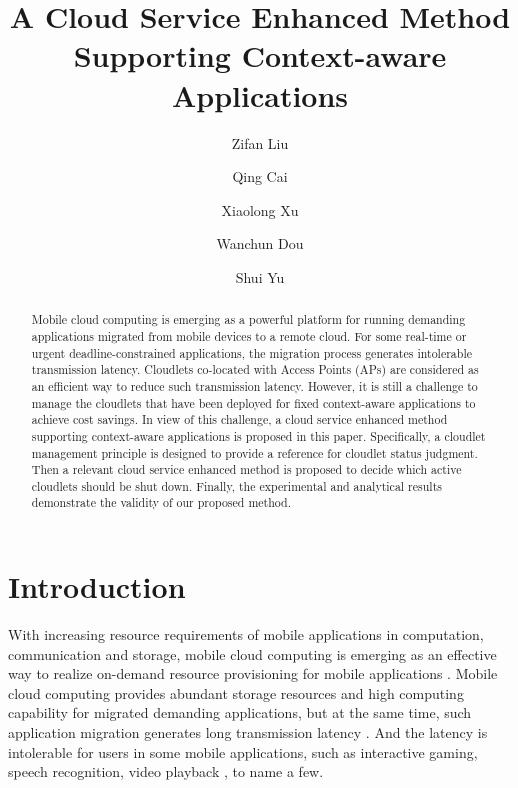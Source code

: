 \documentclass{llncs}
\begin{document}
%
\mainmatter
%
\title{A Cloud Service Enhanced Method Supporting Context-aware Applications}
%
\author{Zifan Liu \and Qing Cai \and Xiaolong Xu \and Wanchun Dou
\and Shui Yu
%
}
\maketitle

\begin{abstract}
Mobile cloud computing is emerging as a powerful platform for running demanding applications migrated from mobile devices to a remote cloud. For some real-time or urgent deadline-constrained applications, the migration process generates intolerable transmission latency. Cloudlets co-located with Access Points (APs) are considered as an efficient way to reduce such transmission latency. However, it is still a challenge to manage the cloudlets that have been deployed for fixed context-aware applications to achieve cost savings. In view of this challenge, a cloud service enhanced method supporting context-aware applications is proposed in this paper. Specifically, a cloudlet management principle is designed to provide a reference for cloudlet status judgment. Then a relevant cloud service enhanced method is proposed to decide which active cloudlets should be shut down. Finally, the experimental and analytical results demonstrate the validity of our proposed method.
\end{abstract}
%
\section{Introduction}
%
With increasing resource requirements of mobile applications in computation, communication and storage, mobile cloud computing is emerging as an effective way to realize on-demand resource provisioning for mobile applications \cite{lo:gao,xu:liang}. Mobile cloud computing provides abundant storage resources and high computing capability for migrated demanding applications, but at the same time, such application migration generates long transmission latency \cite{lo:gao}. And the latency is intolerable for users in some mobile applications, such as interactive gaming, speech recognition, video playback \cite{cohen,mohiuddin:mohammad}, to name a few.
\end{document}
